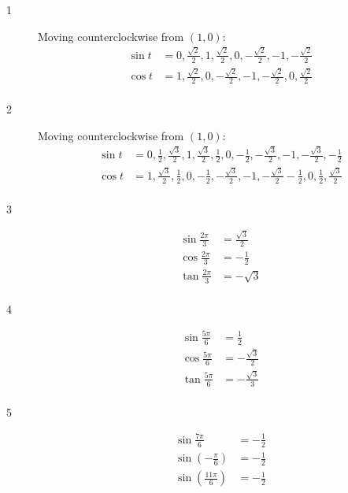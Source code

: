\documentclass{exam}
\begin{document}
    \begin{description}

      \item[1]
        Moving counterclockwise from $(1, 0)$:
        \begin{align*}
          \sin t &= 0, \frac{\sqrt{2}}{2}, 1, \frac{\sqrt{2}}{2}, 0, - \frac{\sqrt{2}}{2}, -1, - \frac{\sqrt{2}}{2} \\
          \cos t &= 1, \frac{\sqrt{2}}{2}, 0, - \frac{\sqrt{2}}{2}, -1, - \frac{\sqrt{2}}{2}, 0, \frac{\sqrt{2}}{2} \\
        \end{align*}

      \item[2]
        Moving counterclockwise from $(1, 0)$:
        \begin{align*}
          \sin t &= 0, \frac{1}{2}, \frac{\sqrt{3}}{2}, 1, \frac{\sqrt{3}}{2}, \frac{1}{2}, 0, -\frac{1}{2},
            -\frac{\sqrt{3}}{2}, -1, - \frac{\sqrt{3}}{2}, - \frac{1}{2} \\
          \cos t &= 1, \frac{\sqrt{3}}{2}, \frac{1}{2}, 0, - \frac{1}{2}, - \frac{\sqrt{3}}{2}, -1, - \frac{\sqrt{3}}{2}
              -\frac{1}{2}, 0, \frac{1}{2}, \frac{\sqrt{3}}{2} \\
        \end{align*}

      \item[3]
        \begin{align*}
          \sin \frac{2 \pi}{3} &= \frac{\sqrt{3}}{2} \\
          \cos \frac{2 \pi}{3} &= - \frac{1}{2} \\
          \tan \frac{2 \pi}{3} &= - \sqrt{3} \\
        \end{align*}

      \item[4]
        \begin{align*}
          \sin \frac{5 \pi}{6} &= \frac{1}{2} \\
          \cos \frac{5 \pi}{6} &= - \frac{\sqrt{3}}{2} \\
          \tan \frac{5 \pi}{6} &= - \frac{\sqrt{3}}{3} \\
        \end{align*}

      \item[5]
        \begin{align*}
          \sin \frac{7 \pi}{6}                 &= - \frac{1}{2} \\
          \sin \left( - \frac{\pi}{6} \right)  &= - \frac{1}{2} \\
          \sin \left( \frac{11 \pi}{6} \right) &= - \frac{1}{2} \\
        \end{align*}


\end{description}
\end{document}
